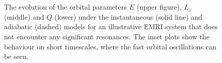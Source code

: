 
\begin{figure}[htbp]
\centering
{}\\
\\
\caption{\label{fig:good-traj}The evolution of the orbital parameters $E$ (upper figure), $L_z$ (middle) and $Q$ (lower) under the instantaneous (solid line) and adiabatic (dashed) models for an illustrative EMRI system that does not encounter any significant resonances. The inset plots show the behaviour on short timescales, where the fast orbital oscillations can be seen.}
\end{figure}



